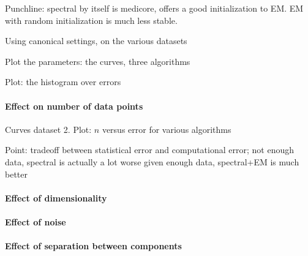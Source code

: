 Punchline: spectral by itself is medicore, offers a good initialization to EM.
EM with random initialization is much less stable.

Using canonical settings, on the various datasets

Plot the parameters: the curves, three algorithms

Plot: the histogram over errors

\paragraph{Effect on number of data points}

Curves dataset 2.
Plot: $n$ versus error for various algorithms

Point: tradeoff between statistical error and computational error;
not enough data, spectral is actually a lot worse
given enough data, spectral+EM is much better

\paragraph{Effect of dimensionality}

\paragraph{Effect of noise}

\paragraph{Effect of separation between components}
